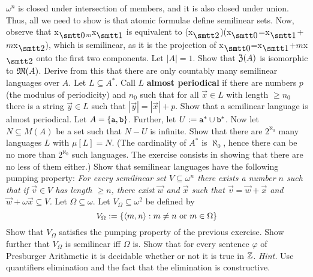 $\omega^n$ is closed under intersection of members, and it is also closed  
under union. Thus, all we need to show is that atomic formulae 
define semilinear sets. Now, observe that 
{\mtt x$_{\snull}$$_m$x$_{\seins}$} is equivalent to 
{\mtt (x$_{\szwei}$)(x$_{\snull}$=x$_{\seins}$+$m$x$_{\szwei}$)}, 
which is semilinear, as it is the projection of 
{\mtt x$_{\snull}$=x$_{\seins}$+$m$x$_{\szwei}$} 
onto the first two components. 
\proofend
\vplatz
\exercise
Let $|A| = 1$. Show that $\mathfrak{Z}(A)$ is isomorphic to $\mathfrak{M}(A)$.
Derive from this that there are only countably many semilinear 
languages over $A$.
\vplatz
\exercise
Let $L \subseteq A^{\ast}$. Call $L$ \textbf{almost periodical} if there 
are numbers $p$ (the modulus of periodicity) and $n_0$ such that 
for all $\vec{x} \in L$ with length $\geq n_0$ there is a string 
$\vec{y} \in L$ such that $|\vec{y}| = |\vec{x}| + p$. Show that 
a semilinear language is almost periodical.  
\vplatz %
\exercise %
\label{ex:semilincont}%
Let $A = \{\mbox{\tt a},
\mbox{\tt b}\}$. Further, let $U := \mbox{\tt a}^{\ast} \cup
\mbox{\tt b}^{\ast}$. Now let $N \subseteq M(A)$ be a set such
that $N - U$ is infinite. Show that there are $2^{\aleph_0}$ many
languages $L$ with $\mu[L] = N$. (The cardinality of
$A^{\ast}$ is $\aleph_0$, hence there can be no more than
$2^{\aleph_0}$ such languages. The exercise consists in 
showing that there are no less of them either.)
\vplatz
\exercise
Show that semilinear languages have the following pumping property: 
{\it For every semilinear set $V \subseteq \omega^n$ there exists a 
number $n$ such that if $\vec{v} \in V$ has length $\geq n$, there 
exist $\vec{w}$ and $\vec{x}$ such that $\vec{v} = \vec{w} + \vec{x}$ 
and $\vec{w} + \omega\vec{x} \subseteq V$.}
\vplatz
\exercise
\label{ex:omega}
Let $\Omega \subseteq \omega$. Let $V_{\Omega} \subseteq \omega^2$ 
be defined by
\begin{equation}
V_{\Omega} := \{\langle m, n\rangle : m \neq n \text{ or }m \in \Omega\}
\end{equation}
Show that $V_{\Omega}$ satisfies the pumping property of the previous 
exercise. Show further that $V_{\Omega}$ is semilinear iff $\Omega$ is. 
\vplatz
\exercise
Show that for every sentence $\varphi$ of Presburger Arithmetic 
it is decidable whether or not it is true in $\mathbb{Z}$. 
{\it Hint.} Use quantifiers elimination and the fact that the 
elimination is constructive.
